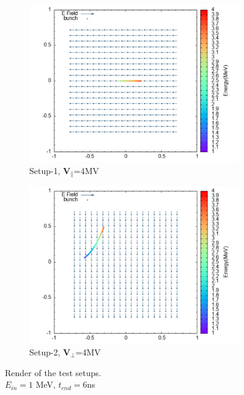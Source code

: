 \documentclass[a4paper,oneside,12pt]{report}
\numberwithin{equation}{chapter}
\begin{document}
\begin{figure}[H]
    \centering
    \begin{subfigure}{0.8\textwidth}
        \centering
        \includegraphics[width=\linewidth]{./figures/rhodoSim/statE_par.png}
        \caption*{Setup-1, $\textbf{V}_{\parallel}$=4MV}
    \end{subfigure}
    \begin{subfigure}{0.8\textwidth}
        \centering
        \includegraphics[width=\linewidth]{./figures/rhodoSim/statE_perp.png}
        \caption*{Setup-2, $\textbf{V}_{\perp}$=4MV}
    \end{subfigure}
    \caption{Render of the test setups. \\ $E_{in}=1$ MeV, $t_{end}=6$ns}
\end{figure}
\end{document}
